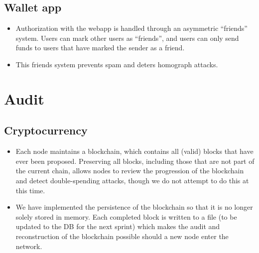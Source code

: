 \documentclass[a4paper,12pt]{article}
\begin{document}
\subsection{Wallet app}

\begin{itemize}
\item Authorization with the webapp is handled through an asymmetric ``friends'' system. Users can mark other users as ``friends'', and users can only send funds to users that have marked the sender as a friend.
\item This friends system prevents spam and deters homograph attacks.
\end{itemize}

\section{Audit}

\subsection{Cryptocurrency}

\begin{itemize}
\item Each node maintains a blockchain, which contains all (valid) blocks that have ever been proposed. Preserving all blocks, including those that are not part of the current chain, allows nodes to review the progression of the blockchain and detect double-spending attacks, though we do not attempt to do this at this time.
\begin{comment}
\item Miners heavily audit the work of other miners in order to maintain the integrity of the blockchain.
\item For each block a miner receives (or broadcasts), its hash will be checked to see if it satisfies a set difficulty.
\item Every transaction inside of the block is verified by checking that each input has a corresponding unspent output (UTXO), that the signature for each input was signed with the private key corresponding to the public key on the previous UTXO, and that the sum of the input amounts (from the UTXO's) is equal to the sum of the outputs.
\item If either of these checks fail, the potential new block will be rejected.
\item So long as an adversary does not control a majority of nodes in the network, blocks will not be added to the blockchain that are not correct.
\end{comment}
\item We have implemented the persistence of the blockchain so that it is no longer solely stored in memory. 
Each completed block is written to a file (to be updated to the DB for the next sprint) which makes the audit and reconstruction of the blockchain possible should a new node enter the network.
\end{itemize}
\end{document}
